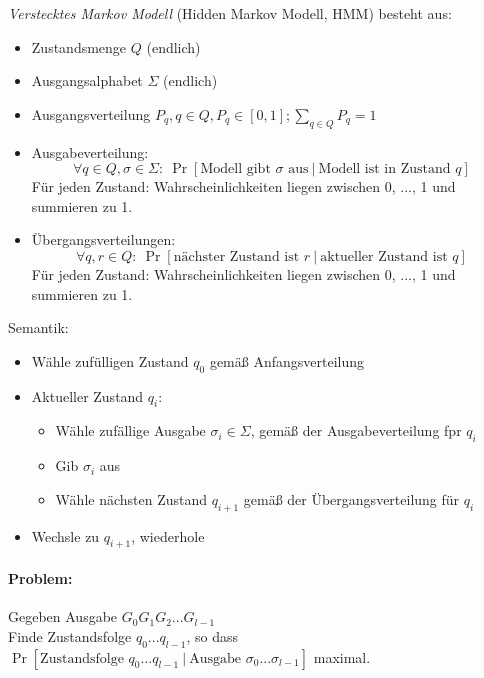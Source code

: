 \Defi \emph{Verstecktes Markov Modell} (Hidden Markov Modell, HMM) besteht aus:
\begin{itemize}
 \item Zustandsmenge $Q$ (endlich)
 \item Ausgangsalphabet $\Sigma$ (endlich)
 \item Ausgangsverteilung $P_q, q \in Q, P_q \in [0,1]; \sum\limits_{q \in Q} P_q = 1$
 \item Ausgabeverteilung: 
     \[\forall q \in Q, \sigma \in \Sigma{:}\ \operatorname{Pr}[\text{Modell gibt $\sigma$ aus}\ |\ \text{Modell ist in Zustand $q$}]\]
     Für jeden Zustand: Wahrscheinlichkeiten liegen zwischen 0, ..., 1 und summieren zu 1.
 \item Übergangsverteilungen:
     \[\forall q,r \in Q{:}\ \operatorname{Pr}[\text{nächster Zustand ist $r$}\ |\ \text{aktueller Zustand ist $q$}]\]
     Für jeden Zustand: Wahrscheinlichkeiten liegen zwischen 0, ..., 1 und summieren zu 1.
\end{itemize}
Semantik:
\begin{itemize}
 \item Wähle zufülligen Zustand $q_0$ gemäß Anfangsverteilung
 \item Aktueller Zustand $q_i$:
     \begin{itemize}
     \item Wähle zufällige Ausgabe $\sigma_i \in \Sigma$, gemäß der Ausgabeverteilung fpr $q_i$
     \item Gib $\sigma_i$ aus
     \item Wähle nächsten Zustand $q_{i+1}$ gemäß der Übergangsverteilung für $q_i$
     \end{itemize}
 \item Wechsle zu $q_{i+1}$, wiederhole
\end{itemize}
\paragraph*{Problem:} Gegeben Ausgabe $G_0G_1G_2...G_{l-1}$ \\
Finde Zustandsfolge $q_0...q_{l-1}$, so dass $\operatorname{Pr}[\text{Zustandsfolge $q_0...q_{l-1}$}\ |\ \text{Ausgabe $\sigma_0...\sigma_{l-1}$}]$ maximal.



